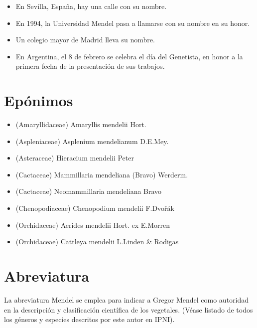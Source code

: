 \documentclass[letterpaper,11pt]{report}
\begin{document}
\begin{itemize}
	\item En Sevilla, España, hay una calle con su nombre.
	\item En 1994, la Universidad Mendel pasa a llamarse con su nombre en su honor.
	\item Un colegio mayor de Madrid lleva su nombre.
	\item En Argentina, el 8 de febrero se celebra el día del Genetista, en honor a la primera fecha de la presentación de sus trabajos.
	
\end{itemize}


\newpage


\chapter{Epónimos}

\begin{itemize}
	\item (Amaryllidaceae) Amaryllis mendelii Hort.
	\item (Aspleniaceae) Asplenium  mendelianum D.E.Mey.
	\item (Asteraceae) Hieracium mendelii Peter
	\item (Cactaceae) Mammillaria mendeliana (Bravo) Werderm.
	\item (Cactaceae) Neomammillaria mendeliana Bravo
	\item (Chenopodiaceae) Chenopodium  mendelii F.Dvořák
	\item (Orchidaceae) Aerides mendelii Hort. ex E.Morren
	\item (Orchidaceae) Cattleya mendelii L.Linden & Rodigas
	
\end{itemize}


\newpage


\chapter{Abreviatura}

La abreviatura Mendel se emplea para indicar a Gregor Mendel como autoridad en la descripción y clasificación científica de los vegetales. (Véase listado de todos los géneros y especies descritos por este autor en IPNI).






\end{document}
